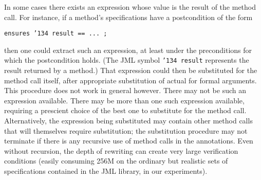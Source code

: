 \documentclass{sig-alternate}
\begin{document}
In some cases there exists an expression whose value is the result of the method call.  For
instance, if a method's specifications have a postcondition of the form
\begin{center}\texttt{ensures \char'134 result == ... ; }\end{center}
then one could extract such an expression, at least under the preconditions for which the
postcondition holds.  (The JML symbol \texttt{\char'134 result} represents the result returned by a method.)  
That expression could then be substituted for the method call itself,
after appropriate substitution of actual for formal arguments.  This procedure does not work
in general however.  There may not be such an expression available.  There may be more than
one such
expression available, requiring a prescient choice of the best one to substitute for the method call.
Alternatively, the expression being substituted may contain other method calls that
will themselves require substitution; the substitution procedure may not terminate if there is
any recursive use of method calls in the annotations.  Even without recursion, the depth of
rewriting can create very large verification conditions (easily consuming 256M on the ordinary
but realistic sets of specifications contained in the JML library, in our experiments).
\end{document}
